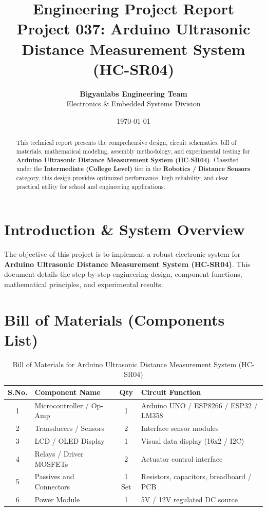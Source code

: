 \documentclass[11pt,a4paper]{article}
\title{\textbf{\Huge Engineering Project Report}\\[0.5em] \Large Project 037: Arduino Ultrasonic Distance Measurement System (HC-SR04)}
\author{\textbf{Bigyanlabs Engineering Team}\\ Electronics \& Embedded Systems Division}
\date{\today}
\begin{document}
\maketitle
\thispagestyle{empty}

\begin{abstract}
This technical report presents the comprehensive design, circuit schematics, bill of materials, mathematical modeling, assembly methodology, and experimental testing for \textbf{Arduino Ultrasonic Distance Measurement System (HC-SR04)}. Classified under the \textbf{Intermediate (College Level)} tier in the \textbf{Robotics / Distance Sensors} category, this design provides optimized performance, high reliability, and clear practical utility for school and engineering applications.
\end{abstract}

\newpage
\tableofcontents
\newpage

\section{Introduction \& System Overview}
The objective of this project is to implement a robust electronic system for \textbf{Arduino Ultrasonic Distance Measurement System (HC-SR04)}. This document details the step-by-step engineering design, component functions, mathematical principles, and experimental results.

\section{Bill of Materials (Components List)}
\begin{table}[h!]
\centering
\caption{Bill of Materials for Arduino Ultrasonic Distance Measurement System (HC-SR04)}
\vspace{0.5em}
\begin{tabular}{clcp{7cm}}
\toprule
\textbf{S.No.} & \textbf{Component Name} & \textbf{Qty} & \textbf{Circuit Function} \\
\midrule
1 & Microcontroller / Op-Amp & 1 & Arduino UNO / ESP8266 / ESP32 / LM358 \\
2 & Transducers / Sensors & 2 & Interface sensor modules \\
3 & LCD / OLED Display & 1 & Visual data display (16x2 / I2C) \\
4 & Relays / Driver MOSFETs & 2 & Actuator control interface \\
5 & Passives and Connectors & 1 Set & Resistors, capacitors, breadboard / PCB \\
6 & Power Module & 1 & 5V / 12V regulated DC source \\
\bottomrule
\end{tabular}
\end{table}
\end{document}
